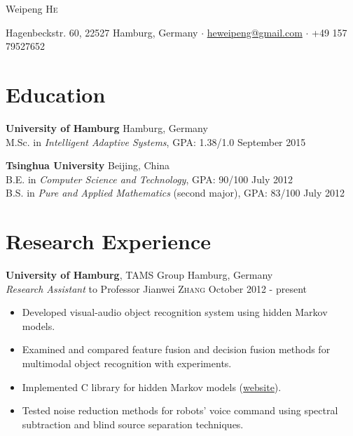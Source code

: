 \documentclass[a4paper,11pt]{article} %
\newcommand{\ind}{\hspace*{1em}}
\begin{document}

\begin{center}
  {\Huge Weipeng \textsc{He}}

  Hagenbeckstr. 60, 22527 Hamburg, Germany $\cdotp$
  \href{mailto:heweipeng@gmail.com}{heweipeng@gmail.com} $\cdotp$
  +49 157 79527652
\end{center}


\section{Education}
\textbf{University of Hamburg} \hfill Hamburg, Germany \\
\ind M.Sc. in \textit{Intelligent Adaptive Systems}, GPA: 1.38/1.0  \hfill September 2015
  
\textbf{Tsinghua University} \hfill Beijing, China \\
\ind B.E. in \textit{Computer Science and Technology}, GPA: 90/100 \hfill July 2012 \\
\ind B.S. in \textit{Pure and Applied Mathematics} (second major), GPA: 83/100 \hfill July 2012


\section{Research Experience}

\textbf{University of Hamburg}, TAMS Group \hfill Hamburg, Germany \\
\textit{Research Assistant} to Professor Jianwei \textsc{Zhang} \hfill October 2012 - present
\vspace{-\parskip}
\begin{itemize}
  \item Developed visual-audio object recognition system using hidden Markov models.
  \item Examined and compared feature fusion and decision fusion methods for multimodal object recognition with experiments.
  \item Implemented C library for hidden Markov models (\href{https://github.com/hwp/notGHMM}{website}).
  \item Tested noise reduction methods for robots' voice command using spectral subtraction and blind source separation techniques.
\end{itemize}
\end{document}
